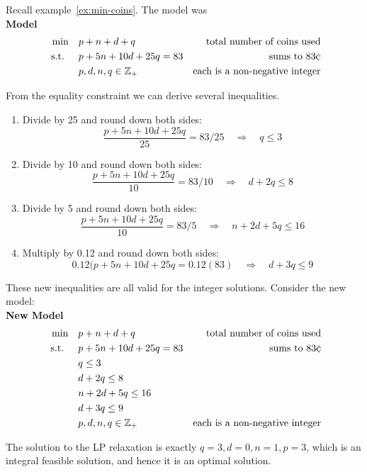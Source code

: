 \begin{example}{}{}
Recall example~\ref{ex:min-coins}.  The model was\\
\textbf{Model}
\begin{align*}
\min \quad & p + n + d + q & \text{ total number of coins used}\\
\text{ s.t. } \quad & p + 5n + 10d + 25 q = 83 & \text{sums to } 83 \cent\\
& p,d,n,q \in \Z_+ & \text{each is a non-negative integer}
\end{align*}

From the equality constraint we can derive several inequalities.
\begin{enumerate}
\item Divide by 25 and round down both sides:
\[
\frac{p + 5n + 10d + 25 q}{25} = 83/25 \quad \Rightarrow \quad q \leq 3 
\]
\item Divide by 10 and round down both sides:
\[
\frac{p + 5n + 10d + 25 q}{10} = 83/10 \quad \Rightarrow \quad d + 2q \leq 8 
\]
\item Divide by 5 and round down both sides:
\[
\frac{p + 5n + 10d + 25 q}{10} = 83/5 \quad \Rightarrow \quad n + 2d  + 5q \leq 16
\]
\item Multiply by 0.12 and round down both sides:
\[
0.12(p + 5n + 10d + 25 q = 0.12 (83) \quad \Rightarrow \quad d  + 3q \leq 9
\]
\end{enumerate}
These new inequalities are all valid for the integer solutions.  Consider the new model:\\

\textbf{New Model}
\begin{align*}
\min \quad & p + n + d + q & \text{ total number of coins used}\\
\text{ s.t. } \quad & p + 5n + 10d + 25 q = 83 & \text{sums to } 83 \cent\\
& q \leq 3\\
& d + 2q \leq 8 \\
& n + 2d  + 5q \leq 16\\
& d  + 3q \leq 9\\
& p,d,n,q \in \Z_+ & \text{each is a non-negative integer}
\end{align*}

The solution to the LP relaxation is exactly $q = 3, d = 0, n = 1, p = 3$, which is an integral feasible solution, and hence it is an optimal solution.
\end{example}


